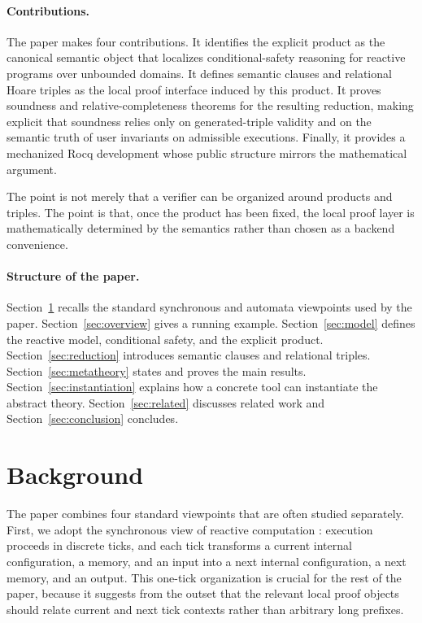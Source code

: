 \documentclass[acmsmall,screen]{acmart}
\theoremstyle{leftplain}
\theoremstyle{leftdefinition}
\theoremstyle{leftremark}
\begin{document}
\paragraph{Contributions.}
The paper makes four contributions. It identifies the explicit product as the
canonical semantic object that localizes conditional-safety reasoning for
reactive programs over unbounded domains. It defines semantic clauses and
relational Hoare triples as the local proof interface induced by this product.
It proves soundness and relative-completeness theorems for the resulting
reduction, making explicit that soundness relies only on generated-triple
validity and on the semantic truth of user invariants on admissible
executions. Finally, it provides a mechanized Rocq development whose public
structure mirrors the mathematical argument.

The point is not merely that a verifier can be organized around products and
triples. The point is that, once the product has been fixed, the local proof
layer is mathematically determined by the semantics rather than chosen as a
backend convenience.

\paragraph{Structure of the paper.}
Section~\ref{sec:background} recalls the standard synchronous and automata
viewpoints used by the paper. Section~\ref{sec:overview} gives a running
example. Section~\ref{sec:model} defines the reactive model, conditional
safety, and the explicit product. Section~\ref{sec:reduction} introduces
semantic clauses and relational triples. Section~\ref{sec:metatheory} states
and proves the main results. Section~\ref{sec:instantiation} explains how a
concrete tool can instantiate the abstract theory. Section~\ref{sec:related}
discusses related work and Section~\ref{sec:conclusion} concludes.

\section{Background}\label{sec:background}
The paper combines four standard viewpoints that are often studied separately.
First, we adopt the synchronous view of reactive computation
\cite{berry-benveniste-sync,halbwachs-1991}: execution proceeds in discrete
ticks, and each tick transforms a current internal configuration, a memory, and
an input into a next internal configuration, a next memory, and an output.
This one-tick organization is crucial for
the rest of the paper, because it suggests from the outset that the relevant
local proof objects should relate current and next tick contexts rather than
arbitrary long prefixes.
\end{document}
